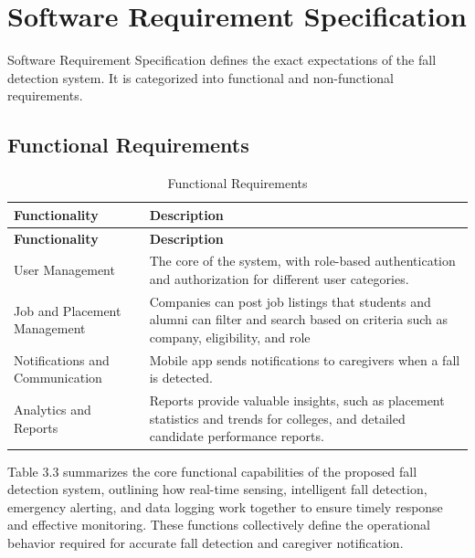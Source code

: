 \documentclass[a4paper, 12pt]{report}
\begin{document}
\section{Software Requirement Specification}
Software Requirement Specification defines the exact expectations of the fall detection system. It is categorized into functional and non-functional requirements.

\subsection{Functional Requirements}
\begin{longtable}{|p{}|p{}|}
    \caption{Functional Requirements}\label{tab:functional_requirements} \\
    
    \hline
    \textbf{Functionality} & \textbf{Description} \\
    \hline
    \endfirsthead

    \hline
    \textbf{Functionality} & \textbf{Description} \\
    \hline
    \endhead

    \hline
    \endfoot

    \hline
    \endlastfoot

    User Management  & The core of the system, with role-based authentication and authorization for different user categories. \\
    \hline
    Job and Placement Management  & Companies can post job listings that students and alumni can filter and search based on criteria such as company, eligibility, and role  \\
    \hline
    Notifications and Communication  & Mobile app sends notifications to caregivers when a fall is detected. \\
    \hline
    Analytics and Reports  & Reports provide valuable insights, such as placement statistics and trends for colleges, and detailed candidate performance reports.\\
\end{longtable}
Table 3.3 summarizes the core functional capabilities of the proposed fall detection system, outlining how real-time sensing, intelligent fall detection, emergency alerting, and data logging work together to ensure timely response and effective monitoring. These functions collectively define the operational behavior required for accurate fall detection and caregiver notification. 
\end{document}
